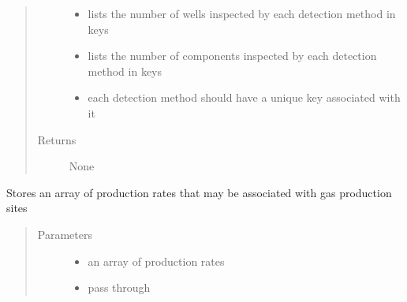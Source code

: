 \documentclass[letterpaper,10pt,english]{sphinxmanual}
\begin{document}
\begin{fulllineitems}
\begin{fulllineitems}
\begin{quote}
\begin{description}
\begin{itemize}
\item {} 
 \textendash{} lists the number of wells inspected by each detection method in keys

\item {} 
 \textendash{} lists the number of components inspected by each detection method in keys

\item {} 
 \textendash{} each detection method should have a unique key associated with it

\end{itemize}

\item[{Returns}] \leavevmode
None

\end{description}\end{quote}

\end{fulllineitems}


\end{fulllineitems}


\begin{fulllineitems}
\label{\detokenize{index:feast.input_data_classes.ProductionData}}
Stores an array of production rates that may be associated with gas production sites
\begin{quote}\begin{description}
\item[{Parameters}] \leavevmode\begin{itemize}
\item {} 
 \textendash{} an array of production rates

\item {} 
 \textendash{} pass through

\end{itemize}

\end{description}\end{quote}

\end{fulllineitems}
\end{document}
